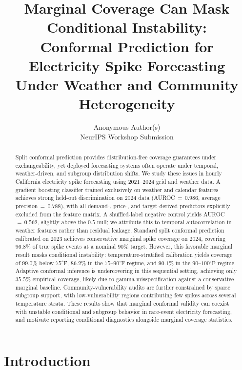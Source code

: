 \documentclass{article}
\title{
  Marginal Coverage Can Mask Conditional Instability:\\
  Conformal Prediction for Electricity Spike Forecasting\\
  Under Weather and Community Heterogeneity
}
\author{
  Anonymous Author(s)\\
  NeurIPS Workshop Submission
}
\begin{document}
\maketitle

\begin{abstract}
Split conformal prediction provides distribution-free coverage guarantees
under exchangeability, yet deployed forecasting systems often operate under
temporal, weather-driven, and subgroup distribution shifts. We study these
issues in hourly California electricity spike forecasting using 2021--2024
grid and weather data. A gradient boosting classifier trained exclusively on
weather and calendar features achieves strong held-out discrimination on
2024 data (AUROC\,${=}\,0.986$, average precision\,${=}\,0.788$), with all
demand-, price-, and target-derived predictors explicitly excluded from the
feature matrix. A shuffled-label negative control yields AUROC\,${=}\,0.562$,
slightly above the $0.5$ null; we attribute this to temporal autocorrelation
in weather features rather than residual leakage. Standard split conformal
prediction calibrated on 2023 achieves conservative marginal spike coverage
on 2024, covering $96.8\%$ of true spike events at a nominal $90\%$ target.
However, this favorable marginal result masks conditional instability:
temperature-stratified calibration yields coverage of $99.0\%$ below
$75^{\circ}$F, $86.2\%$ in the $75$--$90^{\circ}$F regime, and $90.1\%$
in the $90$--$100^{\circ}$F regime. Adaptive conformal inference is
undercovering in this sequential setting, achieving only $35.5\%$ empirical
coverage, likely due to gamma misspecification against a conservative
marginal baseline. Community-vulnerability audits are further constrained by
sparse subgroup support, with low-vulnerability regions contributing few
spikes across several temperature strata. These results show that marginal
conformal validity can coexist with unstable conditional and subgroup
behavior in rare-event electricity forecasting, and motivate reporting
conditional diagnostics alongside marginal coverage statistics.
\end{abstract}

\section{Introduction}
\label{sec:intro}
\end{document}
